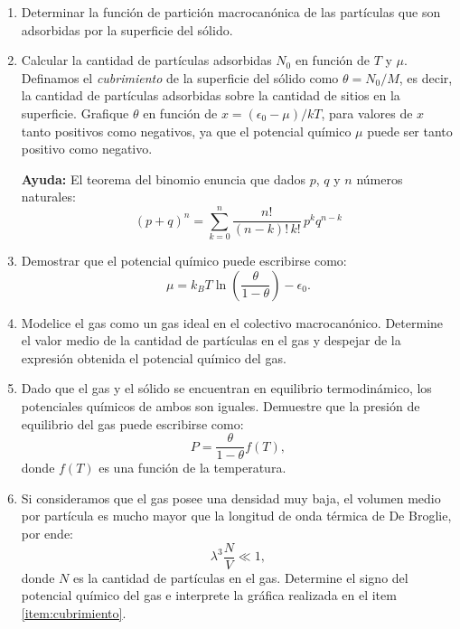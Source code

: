 \documentclass[a4paper,11pt]{article}
\begin{document}
\begin{enumerate}[label=(\alph*),
                  leftmargin=2\parindent,
                  rightmargin=2\parindent]

    \item{Determinar la función de partición macrocanónica de las 
          partículas que son adsorbidas por la superficie del sólido.}

    \item{\label{item:cubrimiento}
          Calcular la cantidad de partículas adsorbidas $N_0$ en función de 
          $T$ y $\mu$.
          Definamos el \emph{cubrimiento} de la superficie del sólido como 
          $\theta = N_0/M$, es decir, la cantidad de partículas adsorbidas 
          sobre la cantidad de sitios en la superficie.
          Grafique $\theta$ en función de $x = (\epsilon_0 - \mu)/kT$, para 
          valores de $x$ tanto positivos como negativos, ya que el potencial 
          químico $\mu$ puede ser tanto positivo como negativo.}
          
    {\small
    \textbf{Ayuda:}
    El teorema del binomio enuncia que dados $p$, $q$ y $n$ números 
    naturales:
    $$ (p + q)^n = \sum_{k=0}^n \frac{n!}{(n-k)! \, k!} \, p^k q^{n-k} $$
    }
    
    \item{Demostrar que el potencial químico puede escribirse 
          como:
          $$
          \mu =
          k_B T \ln \left( \frac{\theta}{1 - \theta} \right) - \epsilon_0.
          $$
          }
    
    \item{Modelice el gas como un gas ideal en el colectivo macrocanónico.
          Determine el valor medio de la cantidad de partículas en el gas y 
          despejar de la expresión obtenida el potencial químico del gas.
          }
    
    \item{Dado que el gas y el sólido se encuentran en equilibrio 
          termodinámico, los potenciales químicos de ambos son iguales. 
          Demuestre que la presión de equilibrio del gas puede escribirse 
          como:
          $$ P = \frac{\theta}{1 - \theta} f(T), $$
          donde $f(T)$ es una función de la temperatura.
          }
    
    \item{Si consideramos que el gas posee una densidad muy baja, el volumen 
          medio por partícula es mucho mayor que la longitud de onda térmica 
          de De Broglie, por ende:
          $$ \lambda^3 \frac{N}{V} \ll 1, $$
          donde $N$ es la cantidad de partículas en el gas.
          Determine el signo del potencial químico del gas e interprete la 
          gráfica realizada en el item \ref{item:cubrimiento}. }

\end{enumerate}
\end{document}
